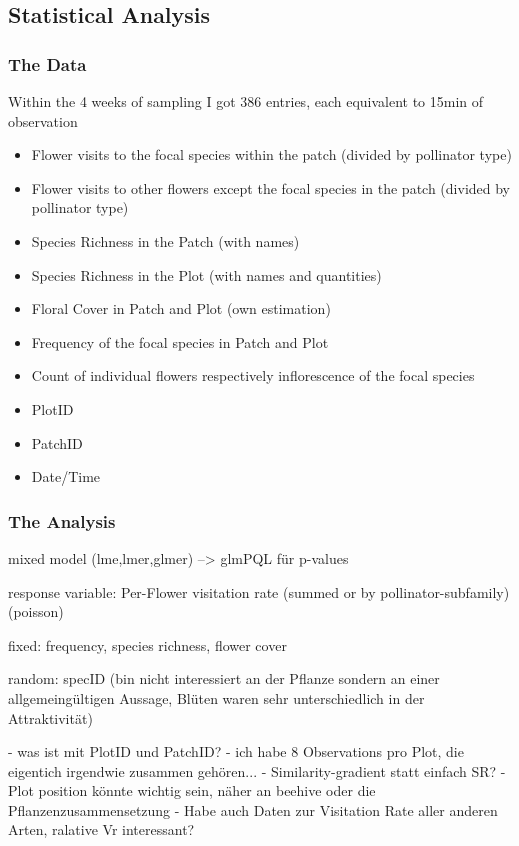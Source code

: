 \subsection{Statistical Analysis}

\subsubsection{The Data}

Within the 4 weeks of sampling I got 386 entries, each equivalent to 15min of observation

\begin{itemize}
\item Flower visits to the focal species within the patch (divided by pollinator type)
\item Flower visits to other flowers except the focal species in the patch (divided by pollinator type)
\item Species Richness in the Patch (with names)
\item Species Richness in the Plot (with names and quantities)
\item Floral Cover in Patch and Plot (own estimation)
\item Frequency of the focal species in Patch and Plot
\item Count of individual flowers respectively inflorescence of the focal species
\item PlotID
\item PatchID
\item Date/Time
\end{itemize}

\subsubsection{The Analysis}


mixed model (lme,lmer,glmer) --> glmPQL für p-values

response variable: Per-Flower visitation rate (summed or by pollinator-subfamily) (poisson)

fixed: frequency, species richness, flower cover

random: specID (bin nicht interessiert an der Pflanze sondern an einer allgemeingültigen Aussage, Blüten waren sehr unterschiedlich in der Attraktivität)

- was ist mit PlotID und PatchID?
- ich habe 8 Observations pro Plot, die eigentich irgendwie zusammen gehören...
- Similarity-gradient statt einfach SR?
- Plot position könnte wichtig sein, näher an beehive oder die Pflanzenzusammensetzung
- Habe auch Daten zur Visitation Rate aller anderen Arten, ralative Vr interessant?


